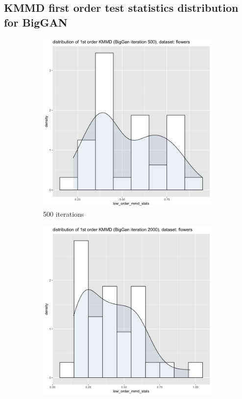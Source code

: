 \documentclass{article}
\begin{document}
\subsection*{KMMD first order test statistics distribution for BigGAN}
\begin{figure}[h!]
    \caption{Dataset Flower}
     \centering
     \begin{subfigure}[b]{0.3\textwidth}
         \centering
         \includegraphics[width=\textwidth]{kmmd_figures/biggan_flower_lowdist_500.png}
         \caption{500 iterations}
     \end{subfigure}
     \hfill
     \begin{subfigure}[b]{0.3\textwidth}
         \centering
         \includegraphics[width=\textwidth]{kmmd_figures/biggan_flower_lowdist_2000.png}

\end{subfigure}
\end{figure}
\end{document}

